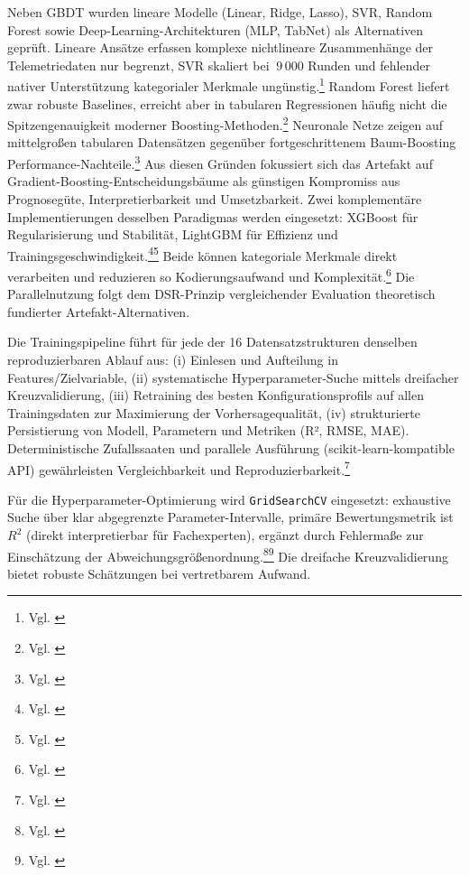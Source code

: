 Neben \ac{GBDT} wurden lineare Modelle (Linear, Ridge, Lasso), \ac{SVR}, Random Forest sowie Deep-Learning-Architekturen (MLP, TabNet) als Alternativen geprüft. Lineare Ansätze erfassen komplexe nichtlineare Zusammenhänge der Telemetriedaten nur begrenzt, \ac{SVR} skaliert bei \(~9\,000\) Runden und fehlender nativer Unterstützung kategorialer Merkmale ungünstig.\footnote{Vgl. \cite{Brown2021SVR}} Random Forest liefert zwar robuste Baselines, erreicht aber in tabularen Regressionen häufig nicht die Spitzengenauigkeit moderner Boosting-Methoden.\footnote{Vgl. \cite{Smith2022RFvGB}} Neuronale Netze zeigen auf mittelgroßen tabularen Datensätzen gegenüber fortgeschrittenem Baum-Boosting Performance-Nachteile.\footnote{Vgl. \cite{Jones2022NNvGBDT}} Aus diesen Gründen fokussiert sich das Artefakt auf Gradient-Boosting-Entscheidungsbäume als günstigen Kompromiss aus Prognosegüte, Interpretierbarkeit und Umsetzbarkeit.
Zwei komplementäre Implementierungen desselben Paradigmas werden eingesetzt: XGBoost für Regularisierung und Stabilität, LightGBM für Effizienz und Trainingsgeschwindigkeit.\footnote{Vgl. \cite{Chen2016XGBoost}}\footnote{Vgl. \cite{Ke2017LightGBM}} Beide können kategoriale Merkmale direkt verarbeiten und reduzieren so Kodierungsaufwand und Komplexität.\footnote{Vgl. \cite{Pedregosa2011ScikitLearn}} Die Parallelnutzung folgt dem DSR-Prinzip vergleichender Evaluation theoretisch fundierter Artefakt-Alternativen.

Die Trainingspipeline führt für jede der 16 Datensatzstrukturen denselben reproduzierbaren Ablauf aus: (i) Einlesen und Aufteilung in Features/Zielvariable, (ii) systematische Hyperparameter-Suche mittels dreifacher Kreuzvalidierung, (iii) Retraining des besten Konfigurationsprofils auf allen Trainingsdaten zur Maximierung der Vorhersagequalität, (iv) strukturierte Persistierung von Modell, Parametern und Metriken (R², RMSE, MAE). Deterministische Zufallssaaten und parallele Ausführung (scikit-learn-kompatible API) gewährleisten Vergleichbarkeit und Reproduzierbarkeit.\footnote{Vgl. \cite{Pedregosa2011ScikitLearn}}

Für die Hyperparameter-Optimierung wird \texttt{GridSearchCV} eingesetzt: exhaustive Suche über klar abgegrenzte Parameter-Intervalle, primäre Bewertungsmetrik ist $R^2$ (direkt interpretierbar für Fachexperten), ergänzt durch Fehlermaße zur Einschätzung der Abweichungsgrößenordnung.\footnote{Vgl. \cite{Bengio2012GridSearch}}\footnote{Vgl. \cite{Pedregosa2011ScikitLearn}} Die dreifache Kreuzvalidierung bietet robuste Schätzungen bei vertretbarem Aufwand.


